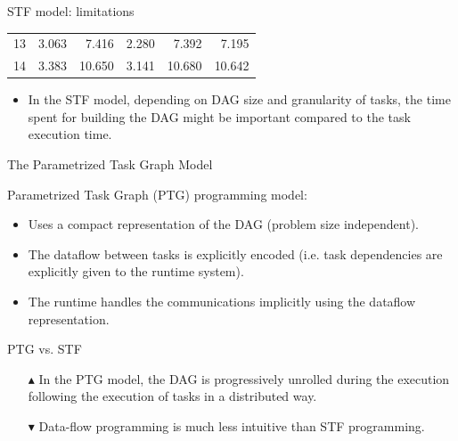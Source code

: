 \documentclass[unknownkeysallowed]{beamer}
\newcommand{\dg}[1]{\textcolor{mgreen}{#1\xspace}}
\newcommand{\dr}[1]{\textcolor{mred}{#1\xspace}}
\newcommand{\db}[1]{\textcolor{mblue}{#1\xspace}}
\newcommand{\dd}[1]{\textcolor{gray!70}{#1\xspace}}
\begin{document}
\begin{frame}{STF model: limitations}
\begin{center}
{{\begin{tabular}{r|rr|rr|r}
        13 & \dd{3.063}                 & \dd{7.416}                 & \dd{2.280} & \dd{7.392}  & \dd{7.195}  \\
        14 & \dd{3.383}                 & \dd{10.650}                & \dd{3.141} & \dd{10.680} & \dd{10.642} \\
        \hline
    \end{tabular}}}  
  \end{center}
  \begin{itemize}
  \item In the STF model, depending on \alert{DAG size} and
    \alert{granularity} of tasks, the time spent for building the DAG
    might be important compared to the task execution time.
  \end{itemize}
\end{frame}

\begin{frame}{The Parametrized Task Graph Model}
  
  \db{Parametrized Task Graph} (PTG) programming model:

  \begin{itemize}
  \item Uses a \alert{compact representation} of the DAG (problem
    size independent).
  \item The dataflow between tasks is \alert{explicitly} encoded
    (i.e. task dependencies are explicitly given to the runtime
    system).
  \item The runtime handles the communications implicitly using the
    dataflow representation.
  \end{itemize}

  \db{PTG} vs. \db{STF}

  \begin{itemize}
  \item[\dg{$\blacktriangle$}] In the PTG model, the DAG is
    \alert{progressively} unrolled during the execution following the
    execution of tasks in a distributed way.
  \item[\dr{$\blacktriangledown$}] Data-flow programming is much less
    intuitive than STF programming.
  \end{itemize}

\end{frame}
\end{document}
